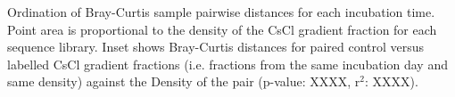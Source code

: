 Ordination of Bray-Curtis sample pairwise distances for each incubation time. Point area is proportional to the density of the CsCl gradient fraction for each sequence library. Inset shows Bray-Curtis distances for paired control versus labelled CsCl gradient fractions (i.e. fractions from the same incubation day and same density) against the Density of the pair (p-value: XXXX, r$^{2}$: XXXX). 
